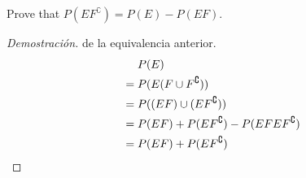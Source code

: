 \item Prove that $P(EF^\complement ) = P(E) - P(EF)$.

\begin{proof}[Demostraci\'on] de la equivalencia anterior.
    \begin{align*}
        &\phantom{{}={}} P(E)\\
        &= P(E(F\cup F^\complement ))\\
        &= P((EF)\cup (EF^\complement ))\\
        &= P(EF) + P(EF^\complement ) - P(EFEF^\complement )\\
        &= P(EF) + P(EF^\complement ) \qedhere
    \end{align*}
\end{proof}
